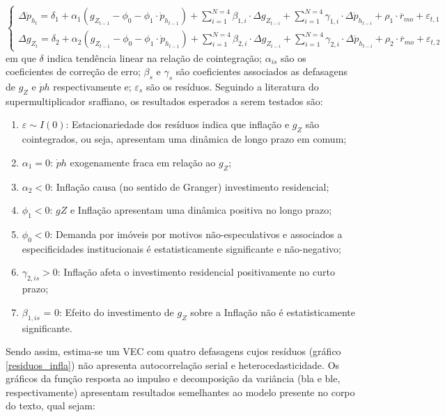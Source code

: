 \begin{equation}
\begin{cases}
\Delta \dot p_{h_t} = \delta_{1} + \alpha_1(g_{Z_{t-1}} - \phi_0 - \phi_1\cdot \dot p_{h_{t-1}}) + \sum^{N=4}_{i=1}\beta_{1,i}\cdot \Delta g_{Z_{t-i}} +
\sum^{N=4}_{i=1}\gamma_{1,i}\cdot \Delta \dot p_{h_{t-i}} + \rho_1\cdot\overline r_{mo} + \varepsilon_{t,1}
\\
\Delta g_{Z_{t}} = \delta_{2} + \alpha_2(g_{Z_{t-1}} - \phi_0 - \phi_1\cdot \dot p_{h_{t-1}}) + \sum^{N=4}_{i=1}\beta_{2,i}\cdot \Delta g_{Z_{t-i}} +
\sum^{N=4}_{i=1}\gamma_{2,i}\cdot \Delta \dot p_{h_{t-i}} + \rho_2\cdot\overline r_{mo} + \varepsilon_{t,2}
\end{cases}
\end{equation}
em que $\delta$ indica tendência linear na relação de cointegração;
$\alpha_{is}$ são os coeficientes de correção de erro; 
$\beta_s$ e $\gamma_s$ são coeficientes associados as defasagens de  $g_Z$ e $\dot ph$ respectivamente e; $\varepsilon_s$ são os resíduos.
Seguindo a literatura do supermultiplicador sraffiano, os resultados esperados a serem testados são:
\begin{enumerate}
	\item $\varepsilon \sim I(0)$: Estacionariedade dos resíduos indica que inflação e $g_Z$ são cointegrados, ou seja, apresentam uma dinâmica de longo prazo em comum;
	\item $\alpha_1 = 0$: $\dot ph$ exogenamente fraca em relação ao $g_Z$;
	\item $\alpha_2 < 0$: Inflação causa (no sentido de Granger) investimento residencial;
	\item $\phi_1 < 0$: $gZ$ e Inflação apresentam uma dinâmica positiva no longo prazo;
	\item $\phi_0 < 0$: Demanda por imóveis por motivos não-especulativos e associados a especificidades institucionais é estatisticamente significante e não-negativo;
	\item $\gamma_{2,is} > 0$: Inflação afeta o investimento residencial positivamente no curto prazo;
	\item $\beta_{1,is}$ = 0: Efeito do investimento de $g_Z$ sobre a Inflação não é estatisticamente significante.
\end{enumerate}


Sendo assim, estima-se um VEC com quatro defasagens cujos resíduos (gráfico \ref{residuos_infla}) não apresenta autocorrelação serial e heterocedasticidade.
Os gráficos da função resposta ao impulso e decomposição da variância (bla e ble, respectivamente) apresentam resultados semelhantes ao modelo presente no corpo do texto, qual sejam:


